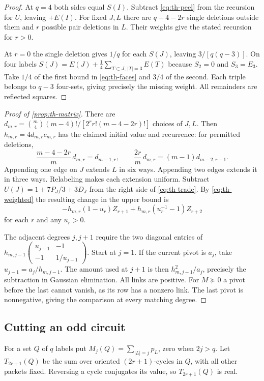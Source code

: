 \documentclass[a4paper,11pt]{amsart}
\numberwithin{equation}{subsection}
\theoremstyle{plain}
\theoremstyle{definition}
\begin{document}
\begin{proof}
At $q=4$ both sides equal $S(I)$. Subtract \autoref{eq:th-peel} from the recursion for $U$, leaving $+E(I)$. For fixed $J,L$ there are $q-4-2r$ single deletions outside them and $r$ possible pair deletions in $L$. Their weights give the stated recursion for $r>0$.

At $r=0$ the single deletion gives $1/q$ for each $S(J)$, leaving $3/[q(q-3)]$. On four labels $S(J)=E(J)+\tfrac14\sum_{T\subset J,\,|T|=3}E(T)$ because $S_2=0$ and $S_3=E_3$. Take $1/4$ of the first bound in \autoref{eq:th-faces} and $3/4$ of the second. Each triple belongs to $q-3$ four-sets, giving precisely the missing weight. All remainders are reflected squares.
\end{proof}

\begin{proof}[Proof of \autoref{prop:th-matrix}]
There are $d_{m,r}=\binom m4(m-4)!/[2^r r!(m-4-2r)!]$ choices of $J,L$. Then $h_{m,r}=4d_{m,r}c_{m,r}$ has the claimed initial value and recurrence: for permitted deletions,
\[
\frac{m-4-2r}{m}\,d_{m,r}=d_{m-1,r},
\qquad \frac{2r}{m}\,d_{m,r}=(m-1)d_{m-2,r-1}.
\]
Appending one edge on $J$ extends $L$ in six ways. Appending two edges extends it in three ways. Relabeling makes each extension uniform. Subtract $U(J)=1+7P_J/3+3D_J$ from the right side of \autoref{eq:th-trade}. By \autoref{eq:th-weighted} the resulting change in the upper bound is
\[
-h_{m,r}(1-u_r)Z_{r+1}+h_{m,r}(u_r^{-1}-1)Z_{r+2}
\]
for each $r$ and any $u_r>0$.

The adjacent degrees $j,j+1$ require the two diagonal entries of
$h_{m,j-1}\left(\begin{smallmatrix}u_{j-1}&-1\\-1&1/u_{j-1}\end{smallmatrix}\right)$.
Start at $j=1$. If the current pivot is $a_j$, take $u_{j-1}=a_j/h_{m,j-1}$. The amount used at $j+1$ is then $h_{m,j-1}^2/a_j$, precisely the subtraction in Gaussian elimination. All links are positive. For $M\succeq0$ a pivot before the last cannot vanish, as its row has a nonzero link. The last pivot is nonnegative, giving the comparison at every matching degree.
\end{proof}

\subsection{Cutting an odd circuit}

For a set $Q$ of $q$ labels put $M_j(Q)=\sum_{|L|=j}p_L$, zero when $2j>q$. Let $T_{2r+1}(Q)$ be the sum over oriented $(2r+1)$-cycles in $Q$, with all other packets fixed. Reversing a cycle conjugates its value, so $T_{2r+1}(Q)$ is real.
\end{document}
